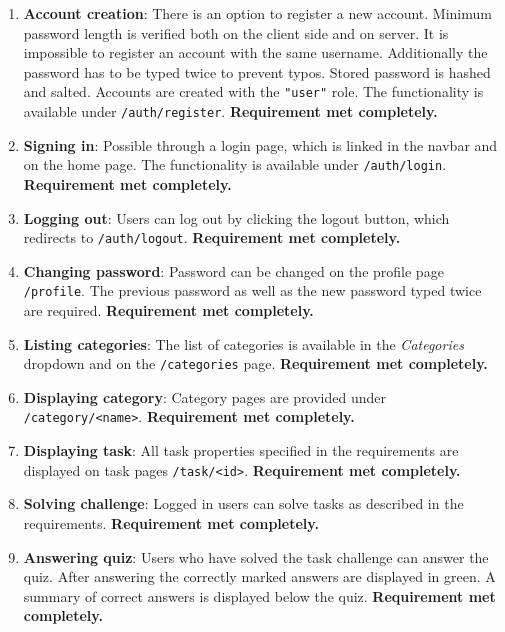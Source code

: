 \begin{enumerate}
	\item \textbf{Account creation}: There is an option to register a new account. Minimum password length is verified both on the client side and on server. It is impossible to register an account with the same username. Additionally the password has to be typed twice to prevent typos. Stored password is hashed and salted. Accounts are created with the \texttt{"user"} role. The functionality is available under \texttt{/auth/register}. \textbf{Requirement met completely.}

	\item \textbf{Signing in}: Possible through a login page, which is linked in the navbar and on the home page. The functionality is available under \texttt{/auth/login}. \textbf{Requirement met completely.}

	\item \textbf{Logging out}: Users can log out by clicking the logout button, which redirects to \texttt{/auth/logout}. \textbf{Requirement met completely.}

	\item \textbf{Changing password}: Password can be changed on the profile page \texttt{/profile}. The previous password as well as the new password typed twice are required. \textbf{Requirement met completely.}

	\item \textbf{Listing categories}: The list of categories is available in the \textit{Categories} dropdown and on the \texttt{/categories} page. \textbf{Requirement met completely.}

	\item \textbf{Displaying category}: Category pages are provided under \texttt{/category/<name>}. \textbf{Requirement met completely.}

	\item \textbf{Displaying task}: All task properties specified in the requirements are displayed on task pages \texttt{/task/<id>}. \textbf{Requirement met completely.}

	\item \textbf{Solving challenge}: Logged in users can solve tasks as described in the requirements. \textbf{Requirement met completely.}

	\item \textbf{Answering quiz}: Users who have solved the task challenge can answer the quiz. After answering the correctly marked answers are displayed in green. A summary of correct answers is displayed below the quiz. \textbf{Requirement met completely.}


\end{enumerate}
